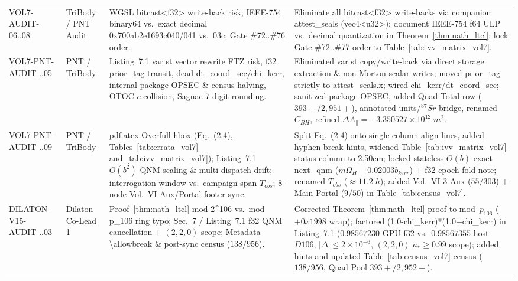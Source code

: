 \documentclass[11pt,a4paper,reqno]{article}
\def\texttt#1{#1}%
\def\mathrm#1{#1}%
\def\mathcal#1{#1}%
\def\mathbb#1{#1}%
\def\Done{D106}%
\theoremstyle{plain}
\theoremstyle{definition}
\theoremstyle{remark}
\numberwithin{equation}{section}
\numberwithin{table}{section}
\newcommand{\Done}{\mathbb{D}_{106}}
\begin{document}
\begin{longtable}{@{} P{2.65cm} P{2.45cm} P{4.10cm} P{\dimexpr\textwidth-9.2cm-6\tabcolsep\relax} @{}}
\texttt{VOL7-AUDIT-06..08} & TriBody / PNT Audit & WGSL \texttt{bitcast<f32>} write-back risk; IEEE-754 \texttt{binary64} vs.\ exact decimal \texttt{0x700ab2e1693c040/041} vs.\ \texttt{03c}; Gate \#72..\#76 order. & Eliminate all \texttt{bitcast<f32>} write-backs via companion \texttt{attest\_seals} (\texttt{vec4<u32>}); document IEEE-754 \texttt{f64} ULP vs.\ decimal quantization in Theorem~\ref{thm:nath_ltcl}; lock Gate \#72..\#77 order to Table~\ref{tab:ivv_matrix_vol7}. \\
\texttt{VOL7-\allowbreak PNT-\allowbreak AUDIT-..05} & PNT / TriBody & Listing~7.1 \texttt{var st} vector rewrite FTZ risk, \texttt{f32} \texttt{prior\_tag} transit, dead \texttt{dt\_coord\_sec}/\texttt{chi\_kerr}, internal package OPSEC \& census halving, OTOC $c$ collision, Sagnac 7-digit rounding. & Eliminated \texttt{var st} copy/write-back via direct storage extraction \& non-Morton scalar writes; moved \texttt{prior\_tag} strictly to \texttt{attest\_seals.x}; wired \texttt{chi\_kerr}/\texttt{dt\_coord\_sec}; sanitized package OPSEC, added Quad Total row ($393+/2{,}951+$), annotated units/$^{87}\mathrm{Sr}$ bridge, renamed $C_{\mathrm{BH}}$, refined $\Delta A_\parallel = -3.350527\times 10^{12}\;\mathrm{m}^2$. \\
\texttt{VOL7-\allowbreak PNT-\allowbreak AUDIT-..09} & PNT / TriBody & \texttt{pdflatex} Overfull \texttt{hbox} (Eq.~(2.4), Tables~\ref{tab:errata_vol7} and~\ref{tab:ivv_matrix_vol7}); Listing~7.1 $\mathcal{O}(b^2)$ QNM scaling \& multi-dispatch drift; interrogation window vs.\ campaign span $T_{\mathrm{obs}}$; 8-node Vol.~VI Aux/Portal footer sync. & Split Eq.~(2.4) onto single-column \texttt{align} lines, added hyphen break hints, widened Table~\ref{tab:ivv_matrix_vol7} status column to \texttt{2.50cm}; locked stateless $\mathcal{O}(b)$-exact \texttt{next\_qnm} ($m\Omega_H - 0.02003 b_{\mathrm{kerr}}$) + \texttt{f32} epoch fold note; renamed $T_{\mathrm{obs}}$ ($\approx 11.2\;\mathrm{h}$); added Vol.~VI 3 Aux ($55/303$) + Main Portal ($9/50$) in Table~\ref{tab:census_vol7}. \\
\texttt{DILATON-\allowbreak V15-\allowbreak AUDIT-..03} & Dilaton Co-Lead 1 & Proof~\ref{thm:nath_ltcl} \texttt{mod 2\^{}106} vs.\ \texttt{mod p\_106} ring typo; Sec.~7 / Listing~7.1 \texttt{f32} QNM cancellation + $(2,2,0)$ scope; Metadata \texttt{\textbackslash allowbreak} \& post-sync census ($138/956$). & Corrected Theorem~\ref{thm:nath_ltcl} proof to \texttt{mod}~$p_{106}$ ($+\texttt{0x1998}$ wrap); factored \texttt{(1.0-chi\_kerr)*(1.0+chi\_kerr)} in Listing~7.1 ($0.98567230$ GPU \texttt{f32} vs.\ $0.98567355$ host $\Done$, $|\Delta|\le 2\times 10^{-6}$, $(2,2,0)$ $a_*\ge 0.99$ scope); added \texttt{\allowbreak} hints and updated Table~\ref{tab:census_vol7} census ($138/956$, Quad Pool $393+/2{,}952+$). \\

\end{longtable}
\end{document}
